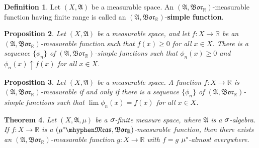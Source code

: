 \documentclass[
twoside=true,
paper=letter,
fontsize=11pt,
pagesize=auto,
leqno,
openany,
headsepline,
overfullrule,
]{scrbook}
\theoremstyle{plain}
\newtheorem{thm}{Theorem}[chapter]
\theoremstyle{plain}
\newtheorem{prop}[thm]{Proposition}
\theoremstyle{definition}
\newtheorem{defn}[thm]{Definition}
\theoremstyle{bfnoteitalic}
\theoremstyle{bfnoteroman}
\newcommand{\term}[1]{\textbf{#1}\index{#1}}
\newcommand{\sigalg}[1]{\mathfrak{#1}}
\newcommand{\borel}{\mathfrak{Bor}}
\newcommand{\textsigma}{\hbox{\large{$\sigma$}}\kern-1pt}
\newcommand{\R}{\mathbb{R}}
\newcommand{\sigmaalgebra}{\sigalg{A}}
\newcommand{\measurable}[1]{{#1}\mhyphen\mathfrak{Meas}}
\newcommand{\kernast}{\ast\kern-1pt}
\newcommand{\mbmeasurable}{$(\measurable{\measure^\kernast},\borel_\R)$\hyp{}measurable}
\newcommand{\measurespace}{X}
\newcommand{\measure}{\mu}
\begin{document}
\begin{defn}\label{simple_function}
Let $(\measurespace, \sigmaalgebra)$ be a measurable space.
An $(\sigmaalgebra, \borel_\R)$\hyp{}measurable function  having finite range is called an $(\sigmaalgebra, \borel_\R)$\hyp{}\term{simple function}.
\end{defn}



\begin{prop}\label{measurable_implies_simple_function_limit}
Let $(\measurespace, \sigmaalgebra)$ be a measurable space, and let $f:\measurespace\to\R$ be an $(\sigmaalgebra, \borel_\R)$\hyp{}measurable function such that $f(x)\geq 0$ for all $x\in\measurespace$. 
There is a sequence $\{\phi_n\}$ of $(\sigmaalgebra, \borel_\R)$-simple functions such that $\phi_n(x)\geq 0$ and $\phi_n(x)\uparrow f(x)$ for all $x\in\measurespace$.
\end{prop}



\begin{prop}\label{measurable_equivalent_simple_function_limit}
Let $(\measurespace, \sigmaalgebra)$ be a measurable space.
A function $f:\measurespace\to\R$ is $(\sigmaalgebra,\borel_\R)$\hyp{}measurable if and only if there is a sequence $\{\phi_n\}$ of $(\sigmaalgebra, \borel_\R)$-simple functions such that $\lim \phi_n(x) = f(x)$ for all $x\in\measurespace$.
\end{prop}



\begin{thm}\label{mixing_measurable_functions}
Let $(\measurespace, \sigmaalgebra, \measure)$ be a $\textsigma$-finite measure space, where $\sigmaalgebra$ is a $\textsigma$-algebra.  If $f:\measurespace\to\R$ is a \mbmeasurable\ function, then there exists an $(\sigmaalgebra,\borel_\R)$\hyp{}measurable function $g:\measurespace\to\R$ with $f=g$ $\measure^\kernast$-almost everywhere.
\end{thm}
\end{document}
